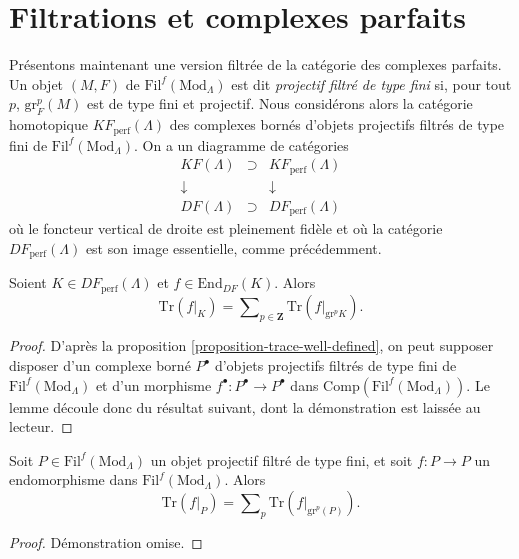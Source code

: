 \section{Filtrations et complexes parfaits}
\label{section-filtrations-perfect}

\noindent
Présentons maintenant une version filtrée de la catégorie des complexes parfaits. Un
objet $(M, F)$ de $\text{Fil}^f(\text{Mod}_\Lambda)$ est dit {\it projectif filtré
de type fini} si, pour tout $p$, $\text{gr}^p_F (M)$ est de type fini et
projectif. Nous considérons alors la catégorie homotopique
$KF_{\text{perf}}(\Lambda)$ des complexes bornés d'objets projectifs filtrés
de type fini de $\text{Fil}^f(\text{Mod}_\Lambda)$. On a un diagramme de
catégories
$$
\begin{matrix}
KF(\Lambda) & \supset & KF_{\text{perf}}(\Lambda)\\
\downarrow & & \downarrow\\
DF(\Lambda) & \supset & DF_{\text{perf}}(\Lambda)
\end{matrix}
$$
où le foncteur vertical de droite est pleinement fidèle et où la catégorie
$DF_{\text{perf}}(\Lambda)$ est son image essentielle, comme précédemment.

\begin{lemma}[Additivité]
\label{lemma-additivity}
Soient $K\in DF_{\text{perf}}(\Lambda)$ et $f\in
\text{End}_{DF}(K)$. Alors
$$
\text{Tr}(f|_K) =
\sum\nolimits_{p\in \mathbf{Z}} \text{Tr}(f|_{\text{gr}^p K}).
$$
\end{lemma}

\begin{proof}
D'après la proposition \ref{proposition-trace-well-defined}, on peut supposer disposer
d'un complexe borné
$P^\bullet$ d'objets projectifs filtrés de type fini de
$\text{Fil}^f(\text{Mod}_\Lambda)$ et d'un morphisme $f^\bullet : P^\bullet\to
P^\bullet$ dans $\text{Comp}(\text{Fil}^f(\text{Mod}_\Lambda))$. Le lemme
découle donc du résultat suivant, dont la démonstration est laissée au lecteur.
\end{proof}

\begin{lemma}
\label{lemma-additive-filtered-finite-projective}
Soit $P \in \text{Fil}^f(\text{Mod}_\Lambda)$ un objet projectif filtré de type fini, et
soit $f : P \to P$ un endomorphisme dans $\text{Fil}^f(\text{Mod}_\Lambda)$. Alors
$$
\text{Tr}(f|_P) =
\sum\nolimits_p \text{Tr}(f|_{\text{gr}^p(P)}).
$$
\end{lemma}

\begin{proof}
Démonstration omise.
\end{proof}







